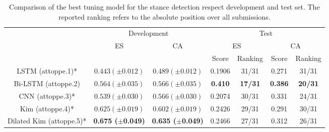 \begin{comment}
\begin{table}[h]
\footnotesize
\caption{Comparison of the best tuning model for the stance detection respect development and test set. The reported ranking refers to the absolute position over all submissions.}
\label{tab:stanceOLD}
\centering
\begin{tabular}{c|cc|cc|cc}
\toprule
\hline
\multirow{3}{*}{System}	& \multicolumn{2}{c|}{Development} & \multicolumn{4}{c}{Test}	\\
\cline{2-7}
						& \multirow{2}{*}{ES}	& \multirow{2}{*}{CA}	& \multicolumn{2}{c|}{ES} & \multicolumn{2}{c}{CA}	\\
\cline{4-7}
						&		&		& Score & Ranking & Score & Ranking \\
\hline
LSTM					& $0.443 (\pm0.012)$ & $0.489 (\pm0.012)$ & - & - & - & - \\
Bi-LSTM					& $0.564 (\pm0.035)$ & $0.566 (\pm0.035)$ & 0.410 & 17/31 & 0.386 & 20/31 \\
CNN						& $0.539 (\pm0.030)$ & $0.566 (\pm0.030)$ & - & - & - & - \\
Kim						& $0.625 (\pm0.019)$ & $0.602 (\pm0.019)$ & - & - & - & - \\
Dilated Kim				& \textbf{0.675 ($\pm$0.049)} & \textbf{0.635 ($\pm$0.049)} & - & - & - & - \\
\hline
\bottomrule
\end{tabular}
\end{table}
\end{comment}


\begin{table}[h]
	\centering
	\caption{Comparison of the best tuning model for the stance detection respect development and test set. The reported ranking refers to the absolute position over all submissions.}
	\label{tab:stance}
	\begin{tabular}{c|cc|cc|cc}
		\hline\noalign{\smallskip}
		\multirow{3}{*}{System}	& \multicolumn{2}{c|}{Development} & \multicolumn{4}{c}{Test}	\\
		\cline{2-7}
		& \multirow{2}{*}{ES}	& \multirow{2}{*}{CA}	& \multicolumn{2}{c|}{ES} & \multicolumn{2}{c}{CA}	\\
		\cline{4-7}
		&		&		& Score & Ranking & Score & Ranking \\
		\noalign{\smallskip}
		\hline
		\noalign{\smallskip}
		LSTM (attoppe.1)*		& $0.443 (\pm0.012)$ & $0.489 (\pm0.012)$ & 0.1906 & 31/31 & 0.271 & 31/31 \\
		Bi-LSTM	(attoppe.2)		& $0.564 (\pm0.035)$ & $0.566 (\pm0.035)$ & \textbf{0.410} & \textbf{17/31} & \textbf{0.386} & \textbf{20/31} \\
		CNN	(attoppe.3)*			& $0.539 (\pm0.030)$ & $0.566 (\pm0.030)$ & 0.2074 & 30/31 & 0.331 & 24/31 \\
		Kim	(attoppe.4)*			& $0.625 (\pm0.019)$ & $0.602 (\pm0.019)$ & 0.2426 & 29/31 & 0.291 & 30/31 \\
		Dilated Kim	(attoppe.5)*	& \textbf{0.675 ($\pm$0.049)} & \textbf{0.635 ($\pm$0.049)} & 0.2466 & 27/31 & 0.312 & 26/31 \\
		\hline
	\end{tabular}
\end{table}


